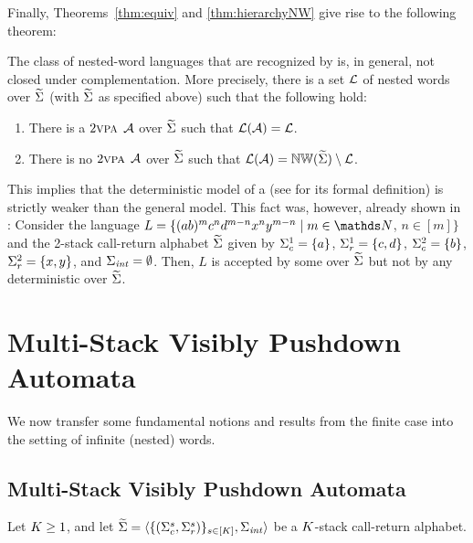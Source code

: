 \documentclass{LMCS}
\begin{document}
Finally, Theorems~\ref{thm:equiv} and \ref{thm:hierarchyNW} give rise to the
following theorem:

\begin{thm}
  The class of nested-word languages that are recognized by \tVPA is, in
  general, not closed under complementation. More precisely, there is a set
  $\mathcal{L}$ of nested words over $\widetilde{\Sigma}$ (with $\widetilde{\Sigma}$ as specified above)
  such that the following hold:
\begin{enumerate}[\em(1)]
\item There is a $2\textsc{vpa}$ $\mathcal{A}$ over $\widetilde{\Sigma}$ such that $\mathcal{L}(\mathcal{A}) = \mathcal{L}$.
\item There is no $2\textsc{vpa}$ $\mathcal{A}$ over $\widetilde{\Sigma}$ such that $\mathcal{L}(\mathcal{A}) =
  \mathbb{NW}(\widetilde{\Sigma}) \setminus \mathcal{L}$.
\end{enumerate}
\end{thm}

This implies that the deterministic model of a \tVPA (see
\cite{Madhusudan2007} for its formal definition) is strictly weaker than the
general model. This fact was, however, already shown in \cite{Madhusudan2007}:
Consider the language $L = \{(ab)^mc^nd^{m-n}x^ny^{m-n} \mid m \in \N$, $n \in
[m]\}$ and the 2-stack call-return alphabet $\widetilde{\Sigma}$ given by
$\Sigma_c^1=\{a\}$, $\Sigma_r^1=\{c,d\}$, $\Sigma_c^2=\{b\}$,
$\Sigma_r^2=\{x,y\}$, and $\Sigma_{\mathit{int}} = \emptyset$. Then, $L$ is accepted by
some \tVPA over $\widetilde{\Sigma}$ but not by any deterministic \tVPA over $\widetilde{\Sigma}$.

\vfill\eject

\section{\Buchi Multi-Stack Visibly Pushdown Automata}\label{sec:buechi}

We now transfer some fundamental notions and results from the finite case into
the setting of infinite (nested) words.

\subsection{\Buchi Multi-Stack Visibly Pushdown Automata}

Let $K \ge 1$, and let $\widetilde{\Sigma} =
\langle\{(\Sigma_c^s,\Sigma_r^s)\}_{s \in
  [K]},\Sigma_{\mathit{int}}\rangle$ be a $K$-stack call-return alphabet.
\end{document}
